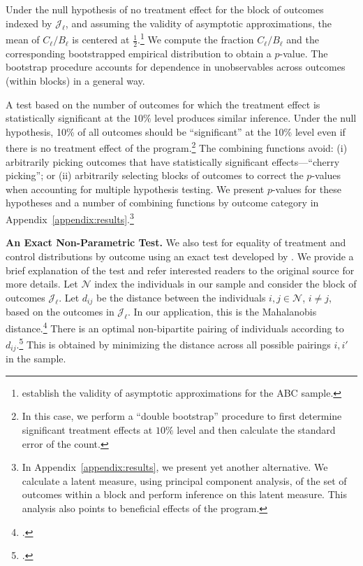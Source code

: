 Under the null hypothesis of no treatment effect for the block of outcomes indexed by $\mathcal{J}_\ell$, and assuming the validity of asymptotic approximations, the mean of $C_\ell / B_\ell$ is centered at $\frac{1}{2}$.\footnote{\citet{Campbell_Conti_etal_2014_EarlyChildhoodInvestments} establish the validity of asymptotic approximations for the ABC sample.} We compute the fraction $C_\ell / B_\ell$ and the corresponding bootstrapped empirical distribution to obtain a $p$-value. The bootstrap procedure accounts for dependence in unobservables across outcomes (within blocks) in a general way.

A test based on the number of outcomes for which the treatment effect is statistically significant at the $10\%$ level produces similar inference. Under the null hypothesis, 10\% of all outcomes should be ``significant'' at the 10\% level even if there is no treatment effect of the program.\footnote{In this case, we perform a ``double bootstrap'' procedure to first determine significant treatment effects at $10\%$ level and then calculate the standard error of the count.} The combining functions avoid: (i) arbitrarily picking outcomes that have statistically significant effects---``cherry picking''; or (ii) arbitrarily selecting blocks of outcomes to correct the $p$-values when accounting for multiple hypothesis testing. We present $p$-values for these hypotheses and a number of combining functions by outcome category in Appendix~\ref{appendix:results}.\footnote{In Appendix~\ref{appendix:results}, we present yet another alternative. We calculate a latent measure, using principal component analysis, of the set of outcomes within a block and perform inference on this latent measure. This analysis also points to beneficial effects of the program.}

\textbf{An Exact Non-Parametric Test.} We also test for equality of treatment and control distributions by outcome using an exact test developed by \citet{Rosenbaum_2005_Distribution_JRSS}. We provide a brief explanation of the test and refer interested readers to the original source for more details. Let $\mathcal{N}$ index the individuals in our sample and consider the block of outcomes $\mathcal{J}_\ell$. Let $d_{ij}$ be the distance between the individuals $i, j \in \mathcal{N}$, $i \neq j$, based on the outcomes in $\mathcal{J}_\ell$. In our application, this is the Mahalanobis distance.\footnote{\citet{Mahalanobis_1936_PNISI}.} There is an optimal non-bipartite pairing of individuals according to $d_{ij}$.\footnote{\citet{Derigs_1988_Solving_AOR}.} This is obtained by minimizing the distance across all possible pairings $i, i'$ in the sample.


